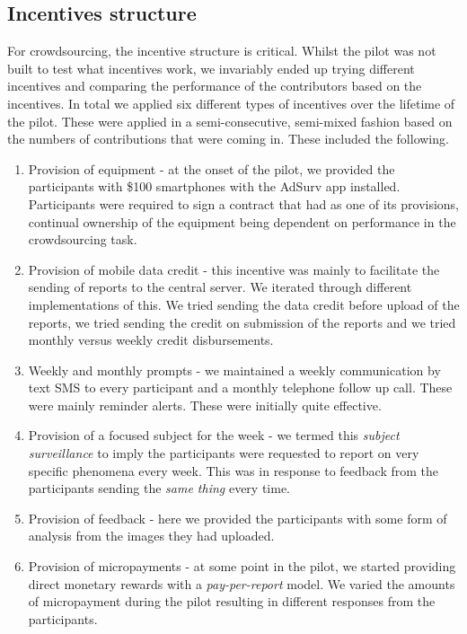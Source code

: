 \documentclass[letterpaper]{article} %
\begin{document}
\subsection{Incentives structure}
For crowdsourcing, the incentive structure is critical. Whilst the pilot was not built to test what incentives work, we invariably ended up trying different incentives and comparing the performance of the contributors based on the incentives. In total we applied six different types of incentives over the lifetime of the pilot. These were applied in a semi-consecutive, semi-mixed fashion based on the numbers of contributions that were coming in. These included the following. 
\begin{enumerate}
\item Provision of equipment - at the onset of the pilot, we provided the participants with \$100 smartphones with the AdSurv app installed. Participants were required to sign a contract that had as one of its provisions, continual ownership of the equipment being dependent on performance in the crowdsourcing task. 
\item Provision of mobile data credit - this incentive was mainly to facilitate the sending of reports to the central server. We iterated through different implementations of this. We tried sending the data credit before upload of the reports, we tried sending the credit on submission of the reports and we tried monthly versus weekly credit disbursements. 
\item Weekly and monthly prompts - we maintained a weekly communication by text SMS to every participant and a monthly telephone follow up call. These were mainly reminder alerts. These were initially quite effective.
\item Provision of a focused subject for the week - we termed this \emph{subject surveillance} to imply the participants were requested to report on very specific phenomena every week. This was in response to feedback from the participants sending the \emph{same thing} every time.
\item Provision of feedback - here we provided the participants with some form of analysis from the images they had uploaded.
\item Provision of micropayments - at some point in the pilot, we started providing direct monetary rewards with a \emph{pay-per-report} model. We varied the amounts of micropayment during the pilot resulting in different responses from the participants.
\end{enumerate}
\end{document}
